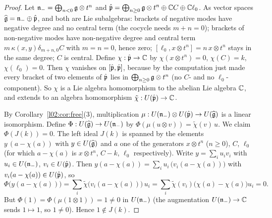 \begin{proof}
Let $\mathfrak{n}_- = \bigoplus_{n<0}\mathfrak{g}\otimes t^n$ and $\hat{\mathfrak{p}} = \bigoplus_{n\ge0}\mathfrak{g}\otimes t^n
\oplus{\mathbb{C}} C\oplus{\mathbb{C}}\ell_0$. As vector spaces $\widehat{\mathfrak{g}} = \mathfrak{n}_-\oplus\hat{\mathfrak{p}}$, and both are Lie
subalgebras: brackets of negative modes have negative degree and no central term (the cocycle needs
$m+n=0$); brackets of non-negative modes have non-negative degree and central term
$m\,\kappa(x,y)\delta_{m+n,0}C$ with $m=n=0$, hence zero; $[\ell_0, x\otimes t^n] = n\,x\otimes t^n$ stays
in the same degree; $C$ is central. Define $\chi:\hat{\mathfrak{p}}\to{\mathbb{C}}$ by $\chi(x\otimes t^n) = 0$,
$\chi(C) = k$, $\chi(\ell_0) = 0$. Then $\chi$ vanishes on $[\hat{\mathfrak{p}},\hat{\mathfrak{p}}]$, because by the
computation just made every bracket of two elements of $\hat{\mathfrak{p}}$ lies in $\bigoplus_{n\ge0}\mathfrak{g}\otimes
t^n$ (no $C$- and no $\ell_0$-component). So $\chi$ is a Lie algebra homomorphism to the abelian Lie
algebra ${\mathbb{C}}$, and extends to an algebra homomorphism $\tilde\chi : U(\hat{\mathfrak{p}})\to{\mathbb{C}}$.

By Corollary~\ref{l02:cor:free}(3), multiplication $\mu: U(\mathfrak{n}_-)\otimes U(\hat{\mathfrak{p}})\to U(\widehat{\mathfrak{g}})$ is
a linear isomorphism. Define $\Phi : U(\widehat{\mathfrak{g}})\to U(\mathfrak{n}_-)$ by $\Phi(\mu(u\otimes v)) =
\tilde\chi(v)\,u$. We claim $\Phi(J(k)) = 0$. The left ideal $J(k)$ is spanned by the elements
$y\,(a-\chi(a))$ with $y\in U(\widehat{\mathfrak{g}})$ and $a$ one of the generators $x\otimes t^n$ ($n\ge0$), $C$,
$\ell_0$ (for which $a - \chi(a)$ is $x\otimes t^n$, $C-k$, $\ell_0$ respectively). Write
$y = \sum_i u_iv_i$ with $u_i\in U(\mathfrak{n}_-)$, $v_i\in U(\hat{\mathfrak{p}})$. Then
$y(a-\chi(a)) = \sum_i u_i\,\bigl(v_i(a-\chi(a))\bigr)$ with $v_i(a-\chi(a))\in U(\hat{\mathfrak{p}})$, so
\begin{equation*}
 \Phi\bigl(y(a-\chi(a))\bigr) = \sum_i\tilde\chi\bigl(v_i(a-\chi(a))\bigr)\,u_i =
 \sum_i\tilde\chi(v_i)\bigl(\chi(a)-\chi(a)\bigr)u_i = 0.
\end{equation*}
But $\Phi(1) = \Phi(\mu(1\otimes1)) = 1\ne0$ in $U(\mathfrak{n}_-)$ (the augmentation $U(\mathfrak{n}_-)\to{\mathbb{C}}$ sends
$1\mapsto1$, so $1\ne0$). Hence $1\notin J(k)$.
\end{proof}

